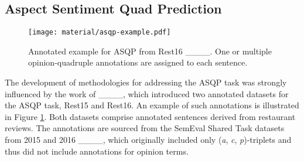 
\subsection{Aspect Sentiment Quad Prediction}

\begin{figure}[ht]
    \centering
    \texttt{[image: material/asqp-example.pdf]}
    \caption{Annotated example for ASQP from Rest16 ____. One or multiple opinion-quadruple annotations are assigned to each sentence.}
    \label{fig:zhang-asqp-example}
\end{figure}


The development of methodologies for addressing the ASQP task was strongly influenced by the work of ____, which introduced two annotated datasets for the ASQP task, Rest15 and Rest16. An example of such annotations is illustrated in Figure \ref{fig:zhang-asqp-example}. Both datasets comprise annotated sentences derived from restaurant reviews. The annotations are sourced from the SemEval Shared Task datasets from 2015 and 2016 
____, which originally included only (\textit{a}, \textit{c}, \textit{p})-triplets and thus did not include annotations for opinion terms. 

